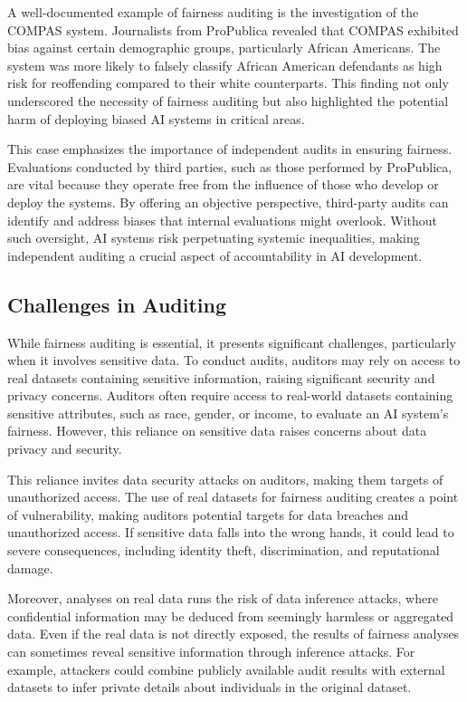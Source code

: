 \documentclass[manuscript,screen,review,anonymous]{acmart}
\begin{document}
A well-documented example of fairness auditing is the investigation of the COMPAS system. Journalists from ProPublica revealed that COMPAS exhibited bias against certain demographic groups, particularly African Americans. The system was more likely to falsely classify African American defendants as high risk for reoffending compared to their white counterparts. This finding not only underscored the necessity of fairness auditing but also highlighted the potential harm of deploying biased AI systems in critical areas.

This case emphasizes the importance of independent audits in ensuring fairness. Evaluations conducted by third parties, such as those performed by ProPublica, are vital because they operate free from the influence of those who develop or deploy the systems. By offering an objective perspective, third-party audits can identify and address biases that internal evaluations might overlook. Without such oversight, AI systems risk perpetuating systemic inequalities, making independent auditing a crucial aspect of accountability in AI development.


\subsection{Challenges in Auditing}

While fairness auditing is essential, it presents significant challenges, particularly when it involves sensitive data. To conduct audits, auditors may rely on access to real datasets containing sensitive information, raising significant security and privacy concerns. Auditors often require access to real-world datasets containing sensitive attributes, such as race, gender, or income, to evaluate an AI system's fairness. However, this reliance on sensitive data raises concerns about data privacy and security.

This reliance invites data security attacks on auditors, making them targets of unauthorized access. The use of real datasets for fairness auditing creates a point of vulnerability, making auditors potential targets for data breaches and unauthorized access. If sensitive data falls into the wrong hands, it could lead to severe consequences, including identity theft, discrimination, and reputational damage.

Moreover, analyses on real data runs the risk of data inference attacks, where confidential information may be deduced from seemingly harmless or aggregated data. Even if the real data is not directly exposed, the results of fairness analyses can sometimes reveal sensitive information through inference attacks. For example, attackers could combine publicly available audit results with external datasets to infer private details about individuals in the original dataset.
\end{document}
